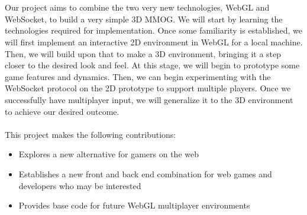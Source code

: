 \documentclass{acmsiggraph}
\begin{document}
\\\\
Our project aims to combine the two very new technologies, WebGL and WebSocket, to build a very simple 3D MMOG. We will start by learning the technologies required for implementation. Once some familiarity is established, we will first implement an interactive 2D environment in WebGL for a local machine. Then, we will build upon that to make a 3D environment, bringing it a step closer to the desired look and feel. At this stage, we will begin to prototype some game features and dynamics. Then, we can begin experimenting with the WebSocket protocol on the 2D prototype to support multiple players. Once we successfully have multiplayer input, we will generalize it to the 3D environment to achieve our desired outcome.
\\\\
This project makes the following contributions:
\begin{itemize}
    \item{Explores a new alternative for gamers on the web}
    \item{Establishes a new front and back end combination for web games and developers who may be interested}
    \item{Provides base code for future WebGL multiplayer environments}
\end{itemize}




\end{document}
